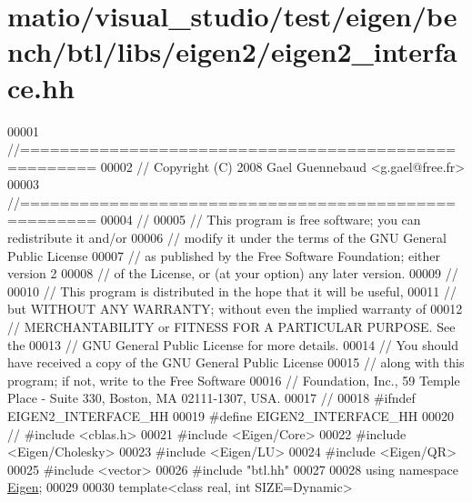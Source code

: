 \hypertarget{matio_2visual__studio_2test_2eigen_2bench_2btl_2libs_2eigen2_2eigen2__interface_8hh_source}{}\section{matio/visual\+\_\+studio/test/eigen/bench/btl/libs/eigen2/eigen2\+\_\+interface.hh}
\label{matio_2visual__studio_2test_2eigen_2bench_2btl_2libs_2eigen2_2eigen2__interface_8hh_source}

\begin{DoxyCode}
00001 \textcolor{comment}{//=====================================================}
00002 \textcolor{comment}{// Copyright (C) 2008 Gael Guennebaud <g.gael@free.fr>}
00003 \textcolor{comment}{//=====================================================}
00004 \textcolor{comment}{//}
00005 \textcolor{comment}{// This program is free software; you can redistribute it and/or}
00006 \textcolor{comment}{// modify it under the terms of the GNU General Public License}
00007 \textcolor{comment}{// as published by the Free Software Foundation; either version 2}
00008 \textcolor{comment}{// of the License, or (at your option) any later version.}
00009 \textcolor{comment}{//}
00010 \textcolor{comment}{// This program is distributed in the hope that it will be useful,}
00011 \textcolor{comment}{// but WITHOUT ANY WARRANTY; without even the implied warranty of}
00012 \textcolor{comment}{// MERCHANTABILITY or FITNESS FOR A PARTICULAR PURPOSE.  See the}
00013 \textcolor{comment}{// GNU General Public License for more details.}
00014 \textcolor{comment}{// You should have received a copy of the GNU General Public License}
00015 \textcolor{comment}{// along with this program; if not, write to the Free Software}
00016 \textcolor{comment}{// Foundation, Inc., 59 Temple Place - Suite 330, Boston, MA  02111-1307, USA.}
00017 \textcolor{comment}{//}
00018 \textcolor{preprocessor}{#ifndef EIGEN2\_INTERFACE\_HH}
00019 \textcolor{preprocessor}{#define EIGEN2\_INTERFACE\_HH}
00020 \textcolor{comment}{// #include <cblas.h>}
00021 \textcolor{preprocessor}{#include <Eigen/Core>}
00022 \textcolor{preprocessor}{#include <Eigen/Cholesky>}
00023 \textcolor{preprocessor}{#include <Eigen/LU>}
00024 \textcolor{preprocessor}{#include <Eigen/QR>}
00025 \textcolor{preprocessor}{#include <vector>}
00026 \textcolor{preprocessor}{#include "btl.hh"}
00027 
00028 \textcolor{keyword}{using namespace }\hyperlink{namespace_eigen}{Eigen};
00029 
00030 \textcolor{keyword}{template}<\textcolor{keyword}{class} real, \textcolor{keywordtype}{int} SIZE=Dynamic>

\end{DoxyCode}
